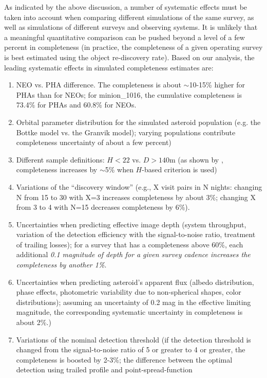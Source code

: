 As indicated by the above discussion, a number of systematic effects must be taken into account when
comparing different simulations of the same survey, as well as simulations of different surveys and observing
systems. It is unlikely that a meaningful quantitative comparison can be pushed beyond a level of a few percent
in completeness (in practice, the completeness of a given operating survey is best estimated using the object
re-discovery rate). Based on our analysis, the leading systematic effects in simulated completeness estimates are:
\begin{enumerate}
\item NEO vs. PHA difference. The completeness is about $\sim$10-15\% higher for PHAs than for NEOs;
for minion\_1016, the cumulative completeness is 73.4\% for PHAs and  60.8\% for NEOs.
\item Orbital parameter distribution for the simulated asteroid population (e.g. the Bottke model
             vs. the Granvik model); varying populations contribute completeness uncertainty of about a few percent)
\item Different sample definitions: $H<22$ vs. $D>140$m (as shown by \citealt{GMS2016}, completeness
           increases by $\sim$5\% when $H$-based criterion is used)
\item Variations of the ``discovery window'' (e.g., X visit pairs in N nights: changing N from 15 to 30 with X=3 increases
          completeness by about 3\%; changing X from 3 to 4 with N=15 decreases completeness by 6\%).
\item Uncertainties when predicting effective image depth (system throughput, variation of the detection efficiency
          with the signal-to-noise ratio, treatment of trailing losses); for a survey that has a completeness above 60\%,
          each additional {\it 0.1 magnitude of depth for a given survey cadence increases the completeness by another 1\%}.
\item Uncertainties when predicting asteroid's apparent flux (albedo distribution, phase effects, photometric variability
          due to non-spherical shapes, color distributions); assuming an uncertainty of 0.2 mag in the effective
          limiting magnitude, the corresponding  systematic uncertainty in completeness is about 2\%.)
\item Variations of the nominal detection threshold (if the detection threshold is changed from the
          signal-to-noise ratio of 5 or greater to 4 or greater, the completeness is boosted by 2-3\%;
          the difference between the optimal detection using trailed profile and point-spread-function

\end{enumerate}

